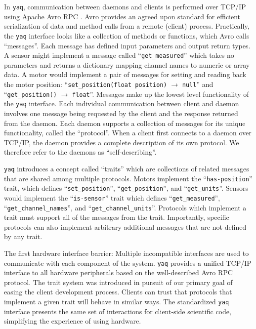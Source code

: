 \documentclass[aip, amsmath, amssymb, reprint,]{revtex4-2}
\newcommand\yaq{\texttt{yaq}}
\begin{document}
In \yaq{}, communication between daemons and clients is performed over TCP/IP using Apache Avro RPC \cite{AvroSpecification}.
Avro provides an agreed upon standard for efficient serialization of data and method calls from a remote (client) process.
Practically, the \yaq{} interface looks like a collection of methods or functions, which Avro calls ``messages''.
Each message has defined input parameters and output return types.
A sensor might implement a message called ``\texttt{get\_measured}'' which takes no parameters and returns a dictionary mapping channel names to numeric or array data.
A motor would implement a pair of messages for setting and reading back the motor position: ``\texttt{set\_position(float position)} $\rightarrow$ \texttt{null}'' and ``\texttt{get\_position()} $\rightarrow$ \texttt{float}''.
Messages make up the lowest level functionality of the \yaq{} interface.
Each individual communication between client and daemon involves one message being requested by the client and the response returned from the daemon.
Each daemon supports a collection of messages for its unique functionality, called the ``protocol''.
When a client first connects to a daemon over TCP/IP, the daemon provides a complete description of its own protocol.
We therefore refer to the daemons as ``self-describing''.

\yaq{} introduces a concept called ``traits'' which are collections of related messages that are shared among multiple protocols.
Motors implement the ``\texttt{has-position}'' trait, which defines ``\texttt{set\_position}'', ``\texttt{get\_position}'', and ``\texttt{get\_units}''.
Sensors would implement the ``\texttt{is-sensor}'' trait which defines ``\texttt{get\_measured}'', ``\texttt{get\_channel\_names}'', and ``\texttt{get\_channel\_units}''.
Protocols which implement a trait must support all of the messages from the trait.
Importantly, specific protocols can also implement arbitrary additional messages that are not defined by any trait.

The first hardware interface barrier: Multiple incompatible interfaces are used to communicate with each component of the system. %
\yaq{} provides a unified TCP/IP interface to all hardware peripherals based on the well-described Avro RPC protocol.
The trait system was introduced in pursuit of our primary goal of easing the client development process.
Clients can trust that protocols that implement a given trait will behave in similar ways.
The standardized \yaq{} interface presents the same set of interactions for client-side scientific code, simplifying the experience of using hardware.
\end{document}

